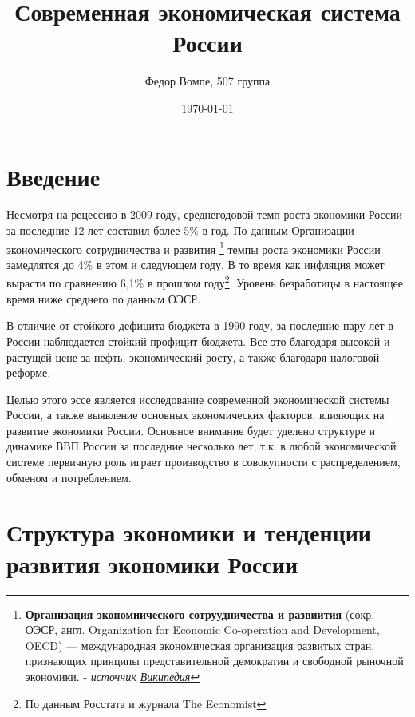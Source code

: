 \documentclass[a4paper,12pt]{article}
\title{Современная экономическая система России} %
\author{Федор Вомпе, 507 группа}
\date{\today} %
\begin{document}
\maketitle

\section{Введение}

Несмотря на рецессию в 2009 году, среднегодовой темп роста экономики России за
последние 12 лет составил более 5\% в год\cite{TheEconomist}. По данным
Организации экономического сотрудничества и развития 
\footnote{ \textbf{Организация экономиического сотруудничества
и развиития} (сокр. ОЭСР, англ. Organization for Economic Co-operation and
Development, OECD) — международная экономическая организация развитых стран,
признающих принципы представительной демократии и свободной рыночной экономики.
- \textit{источник
\href{http://ru.wikipedia.org/wiki/Организация экономиического сотрудничества
и развиития}{Википедия}} } темпы роста экономики России замедлятся 
до 4\% в этом и следующем году\cite{StandardPoor}. В то время как инфляция может
вырасти по сравнению 6,1\% в прошлом году\footnote{По данным
Росстата\cite{Rosstat} и журнала The Economist\cite{TheEconomist}}. Уровень
безработицы в настоящее время ниже среднего по данным ОЭСР.

В отличие от стойкого дефицита бюджета в 1990 году, за последние пару лет
в России наблюдается стойкий профицит бюджета. Все это благодаря
высокой и растущей цене за нефть, экономический росту, а также
благодаря налоговой реформе.

Целью этого эссе является исследование современной экономической
системы России, а также выявление основных экономических факторов, влияющих на
развитие экономики России. Основное внимание будет уделено структуре и динамике
ВВП России за последние несколько лет, т.к. в любой экономической системе
первичную роль играет производство в совокупности с распределением, обменом и потреблением.

\section{Структура экономики и тенденции развития экономики России}
\end{document}
